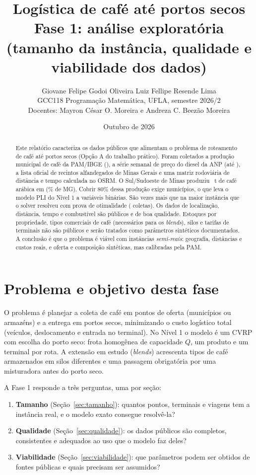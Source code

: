 \documentclass[11pt,a4paper]{article}
\title{\textbf{Logística de café até portos secos}\\[2pt]
\large Fase 1: análise exploratória (tamanho da instância, qualidade e viabilidade dos dados)}
\author{Giovane Felipe Godoi Oliveira \quad Luiz Fellipe Resende Lima\\
\small GCC118 Programação Matemática, UFLA, semestre 2026/2\\
\small Docentes: Mayron César O. Moreira e Andreza C. Beezão Moreira}
\date{Outubro de 2026}
\begin{document}
\maketitle

\begin{abstract}
\noindent
Este relatório caracteriza os dados públicos que alimentam o problema de roteamento de café até portos secos
(Opção A do trabalho prático). Foram coletados a produção municipal de café da PAM/IBGE (\AnoPAM), a série semanal de
preço do diesel da ANP (até \DieselFim), a lista oficial de recintos alfandegados de Minas Gerais e uma matriz
rodoviária de distância e tempo calculada no OSRM. O Sul/Sudoeste de Minas produziu \ProdSul~t de café arábica em
\AnoPAM{} (\PctSulMG\% de MG). Cobrir 80\% dessa produção exige \NSulOitenta{} municípios, o que leva o modelo PLI do
Nível 1 a \BinOitenta{} variáveis binárias. São \RazaoBin{} vezes mais que na maior instância que o solver resolveu
com prova de otimalidade (\NOtimoNivelUm{} coletas). Os dados de localização, distância, tempo e combustível são públicos e de boa
qualidade. Estoques por propriedade, tipos comerciais de café (necessários para os \emph{blends}), silos e tarifas de
terminais não são públicos e serão tratados como parâmetros sintéticos documentados. A conclusão é que o problema é
viável com instâncias \emph{semi-reais}: geografia, distâncias e custos reais, e oferta e composição sintéticas, mas
calibradas pela PAM.
\end{abstract}

\section{Problema e objetivo desta fase}

O problema é planejar a coleta de café em pontos de oferta (municípios ou armazéns) e a entrega em portos secos,
minimizando o custo logístico total (veículos, deslocamento e entrada no terminal). No Nível 1 o modelo é um CVRP com
escolha do porto seco: frota homogênea de capacidade $Q$, um produto e um terminal por rota. A extensão em estudo
(\emph{blends}) acrescenta tipos de café armazenados em silos diferentes e uma passagem obrigatória por uma
misturadora antes do porto seco.

A Fase 1 responde a três perguntas, uma por seção:
\begin{enumerate}
  \item \textbf{Tamanho} (Seção~\ref{sec:tamanho}): quantos pontos, terminais e viagens tem a instância real, e o modelo
        exato consegue resolvê-la?
  \item \textbf{Qualidade} (Seção~\ref{sec:qualidade}): os dados públicos são completos, consistentes e adequados ao
        uso que o modelo faz deles?
  \item \textbf{Viabilidade} (Seção~\ref{sec:viabilidade}): que parâmetros podem ser obtidos de fontes públicas e quais
        precisam ser assumidos?
\end{enumerate}
\end{document}

